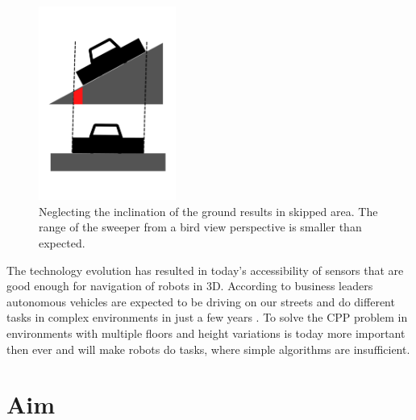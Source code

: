 \begin{figure}
    \centering
    \includegraphics[width=0.4\textwidth]{figures/design.pdf}
    \caption{Neglecting the inclination of the ground results in skipped area. The range of the sweeper from a bird view perspective is smaller than expected.}
    \label{fig:2dproblem}
\end{figure}

The technology evolution has resulted in today's accessibility of sensors that are good enough for navigation of robots in 3D. According to business leaders autonomous vehicles are expected to be driving on our streets and do different tasks in complex environments in just a few years \cite{expertsai}. To solve the CPP problem in environments with multiple floors and height variations is today more important then ever and will make robots do tasks, where simple algorithms are insufficient.





\section{Aim}
\label{sec:aim}


